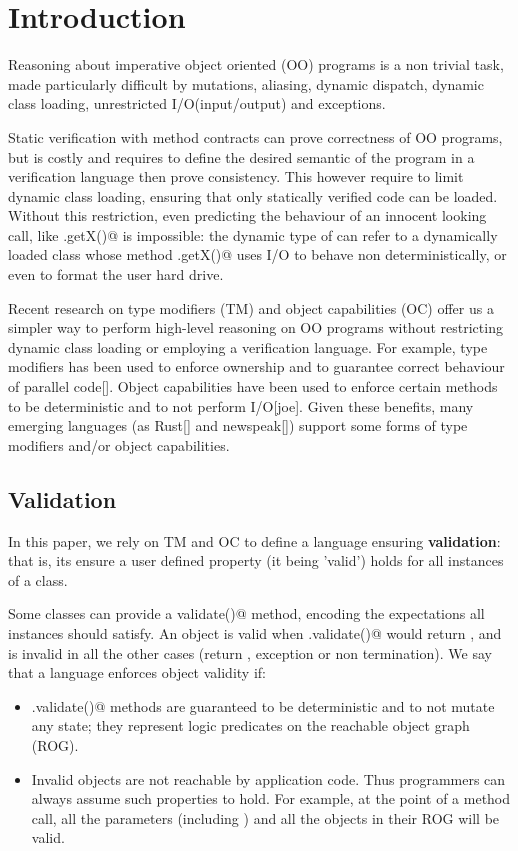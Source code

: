 
\section{Introduction}
\saveSpace\saveSpace
Reasoning about imperative object oriented (OO) programs is a non trivial task,
made particularly difficult by mutations, aliasing, dynamic dispatch, dynamic class loading,
unrestricted I/O(input/output) and exceptions.

Static verification with method contracts can prove correctness of OO programs, but is costly and requires to define the desired semantic of the program in a verification language then prove consistency.
This however require to limit dynamic class loading, ensuring that only statically verified code can be loaded.
Without this restriction, even predicting the behaviour of an innocent looking call, like 
\Q@myPoint.getX()@ is impossible: the dynamic type of \Q@myPoint@ can refer to a dynamically loaded class
whose method \Q@.getX()@ uses I/O to behave non deterministically, or even to format the user hard drive.

Recent research on type modifiers (TM) and object capabilities (OC) offer us a simpler way to perform high-level reasoning on OO programs without restricting dynamic class loading or employing a verification language.
For example, type modifiers has been used to enforce ownership and to guarantee correct behaviour of
parallel code[]. Object capabilities have been used to enforce certain methods to be deterministic and to not perform I/O[joe].
Given these benefits, many emerging languages (as Rust[] and newspeak[])
support some forms of type modifiers and/or object capabilities.

\loseSpace

\subsection{Validation}
In this paper, we rely on TM and OC to define a language ensuring \textbf{validation}: that is, its ensure a user defined property (it being 'valid') holds for all instances of a class.

Some classes can provide a \Q@Bool validate()@ method, encoding the expectations
all instances should satisfy.
An object \Q@o@ is valid when \Q@o.validate()@ would return \Q@true@, and is invalid in all the other cases (return \Q@false@, exception or non termination).
We say that a language enforces object validity if:
\begin{itemize}
\item \Q@.validate()@ methods are guaranteed to be deterministic and to not mutate any state; they represent logic predicates on the reachable object graph (ROG).
\item Invalid objects are not reachable by application code. Thus programmers can always assume such properties to hold.
For example, at the point of a method call,
all the parameters (including \Q@this@) and all the objects in their ROG will be valid.
\end{itemize}

